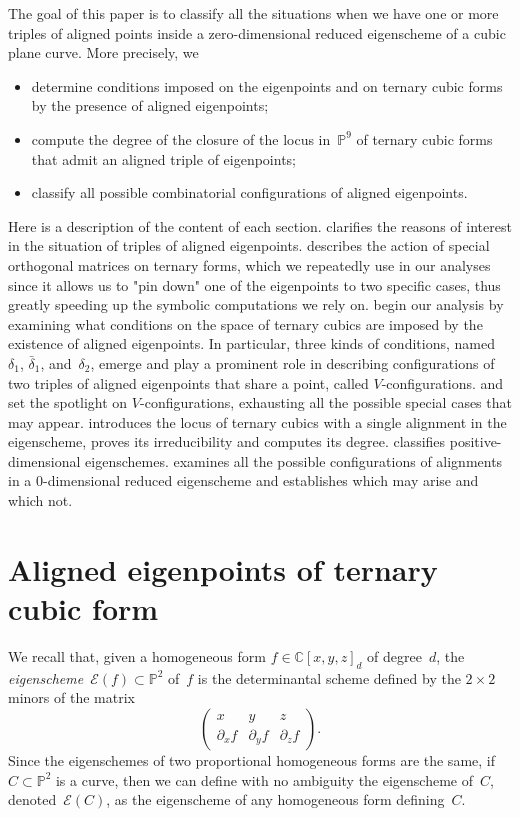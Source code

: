 \documentclass{amsart}
\theoremstyle{plain}
\theoremstyle{definition}
\newcommand{\C}{\mathbb{C}}
\newcommand{\p}{\mathbb{P}}
\newcommand{\de}{\partial}
\newcommand{\Eig}[1]{\mathcal{E}\!\left( {#1} \right)}
\begin{document}
The goal of this paper is to classify all the situations when we have one or more triples of aligned points inside a zero-dimensional reduced eigenscheme of a cubic plane curve.
More precisely, we
%
\begin{itemize}
    \item determine conditions imposed on the eigenpoints and on ternary cubic forms by the presence of aligned eigenpoints;
    \item compute the degree of the closure of the locus in~$\p^9$ of ternary cubic forms that admit an aligned triple of eigenpoints;
    \item classify all possible combinatorial configurations of aligned eigenpoints.
\end{itemize}
%
Here is a description of the content of each section.
 clarifies the reasons of interest in the situation of triples of aligned eigenpoints.
 describes the action of special orthogonal matrices on ternary forms, which we repeatedly use in our analyses since it allows us to "pin down" one of the eigenpoints to two specific cases, thus greatly speeding up the symbolic computations we rely on.
 begin our analysis by examining what conditions on the space of ternary cubics are imposed by the existence of aligned eigenpoints. In particular, three kinds of conditions, named~$\delta_1$, $\bar{\delta}_1$, and~$\delta_2$, emerge and play a prominent role in describing configurations of two triples of aligned eigenpoints that share a point, called $V$-configurations.
 and  set the spotlight on $V$-configurations, exhausting all the possible special cases that may appear.
 introduces the locus of ternary cubics with a single alignment in the eigenscheme, proves its irreducibility and computes its degree.
 classifies positive-dimensional eigenschemes.
 examines all the possible configurations of alignments in a $0$-dimensional reduced eigenscheme and establishes which may arise and which not.


\section{Aligned eigenpoints of ternary cubic form}
\label{aligned}

We recall that, given a homogeneous form $f \in \C[x,y,z]_d$ of degree~$d$, the \emph{eigenscheme}~$\Eig{f} \subset \p^2$ of~$f$ is the determinantal scheme defined by the $2 \times 2$ minors of the matrix
%
\begin{equation}
\label{eq:def_matrix}
  \begin{pmatrix}
    x & y & z \\
    \de_x f & \de_y f & \de_z f
  \end{pmatrix}.
\end{equation}
%
Since the eigenschemes of two proportional homogeneous forms are the same,
if $C \subset \p^2$ is a curve, then we can define with no ambiguity the eigenscheme of~$C$, denoted~$\Eig{C}$, as the eigenscheme of any homogeneous form defining~$C$.
\end{document}
